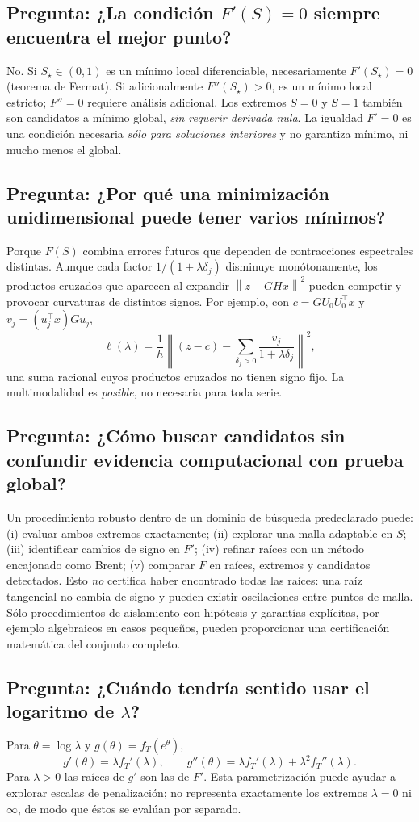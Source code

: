 \documentclass[11pt,letterpaper,parskip=half,headings=small]{scrartcl}
\theoremstyle{definition}\newtheorem{definicion}[proposicion]{Definición}
\theoremstyle{remark}\newtheorem{observacion}[proposicion]{Observación}
\newcommand{\norm}[1]{\left\lVert#1\right\rVert}\newcommand{\inner}[2]{\left\langle#1,#2\right\rangle}
\newcommand{\pregunta}[1]{\subsection{Pregunta: #1}}
\begin{document}
\pregunta{¿La condición $F'(S)=0$ siempre encuentra el mejor punto?}
No. Si $S_\star\in(0,1)$ es un mínimo local diferenciable, necesariamente $F'(S_\star)=0$ (teorema de Fermat). Si adicionalmente $F''(S_\star)>0$, es un mínimo local estricto; $F''=0$ requiere análisis adicional. Los extremos $S=0$ y $S=1$ también son candidatos a mínimo global, \emph{sin requerir derivada nula}. La igualdad $F'=0$ es una condición necesaria \emph{sólo para soluciones interiores} y no garantiza mínimo, ni mucho menos el global.

\pregunta{¿Por qué una minimización unidimensional puede tener varios mínimos?}
Porque $F(S)$ combina errores futuros que dependen de contracciones espectrales distintas. Aunque cada factor $1/(1+\lambda\delta_j)$ disminuye monótonamente, los productos cruzados que aparecen al expandir $\norm{z-GHx}^2$ pueden competir y provocar curvaturas de distintos signos. Por ejemplo, con $c=G U_0U_0^\top x$ y $v_j=(u_j^\top x)Gu_j$,
\begin{equation}\label{eq:rational}
\ell(\lambda)=\frac1h\norm{(z-c)-\sum_{\delta_j>0}\frac{v_j}{1+\lambda\delta_j}}^2,
\end{equation}
una suma racional cuyos productos cruzados no tienen signo fijo. La multimodalidad es \emph{posible}, no necesaria para toda serie.

\pregunta{¿Cómo buscar candidatos sin confundir evidencia computacional con prueba global?}
Un procedimiento robusto dentro de un dominio de búsqueda predeclarado puede: (i) evaluar ambos extremos exactamente; (ii) explorar una malla adaptable en $S$; (iii) identificar cambios de signo en $F'$; (iv) refinar raíces con un método encajonado como Brent; (v) comparar $F$ en raíces, extremos y candidatos detectados. Esto \emph{no} certifica haber encontrado todas las raíces: una raíz tangencial no cambia de signo y pueden existir oscilaciones entre puntos de malla. Sólo procedimientos de aislamiento con hipótesis y garantías explícitas, por ejemplo algebraicos en casos pequeños, pueden proporcionar una certificación matemática del conjunto completo.

\pregunta{¿Cuándo tendría sentido usar el logaritmo de $\lambda$?}
Para $\theta=\log\lambda$ y $g(\theta)=f_T(e^\theta)$,
\begin{equation}\label{eq:logderiv}
\boxed{g'(\theta)=\lambda f_T'(\lambda),\qquad
 g''(\theta)=\lambda f_T'(\lambda)+\lambda^2f_T''(\lambda).}
\end{equation}
Para $\lambda>0$ las raíces de $g'$ son las de $F'$. Esta parametrización puede ayudar a explorar escalas de penalización; no representa exactamente los extremos $\lambda=0$ ni $\infty$, de modo que éstos se evalúan por separado.
\end{document}
